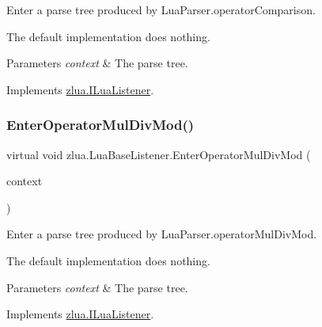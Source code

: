 Enter a parse tree produced by Lua\+Parser.\+operator\+Comparison. 

The default implementation does nothing.


\begin{DoxyParams}{Parameters}
{\em context} & The parse tree.\\
\hline
\end{DoxyParams}


Implements \mbox{\hyperlink{interfacezlua_1_1_i_lua_listener_a5af42c94cc987459977c34f85b037120}{zlua.\+I\+Lua\+Listener}}.

\mbox{\label{classzlua_1_1_lua_base_listener_a4a1422260529c79e0e43d89652182159}} 
\subsubsection{\texorpdfstring{Enter\+Operator\+Mul\+Div\+Mod()}{EnterOperatorMulDivMod()}}
{\footnotesize\ttfamily virtual void zlua.\+Lua\+Base\+Listener.\+Enter\+Operator\+Mul\+Div\+Mod (\begin{DoxyParamCaption}\item[{\mbox{[}\+Not\+Null\mbox{]} \mbox{\hyperlink{classzlua_1_1_lua_parser_1_1_operator_mul_div_mod_context}{Lua\+Parser.\+Operator\+Mul\+Div\+Mod\+Context}}}]{context }\end{DoxyParamCaption})\hspace{0.3cm}{\ttfamily [virtual]}}



Enter a parse tree produced by Lua\+Parser.\+operator\+Mul\+Div\+Mod. 

The default implementation does nothing.


\begin{DoxyParams}{Parameters}
{\em context} & The parse tree.\\
\hline
\end{DoxyParams}


Implements \mbox{\hyperlink{interfacezlua_1_1_i_lua_listener_ab6bb494a78b26f8483ef9d872c82c8d6}{zlua.\+I\+Lua\+Listener}}.

\mbox{\label{classzlua_1_1_lua_base_listener_afc55e8820e1e62e135f4c2fd0d69825d}} 
